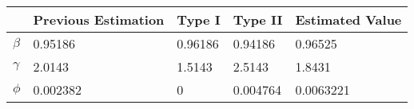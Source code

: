\begin{tabular}{lllll}
& Previous Estimation & Type I & Type II & Estimated Value \\ 
\hline 
$\beta$ & 0.95186 & 0.96186 & 0.94186 & 0.96525 \\ 
$\gamma$ & 2.0143 & 1.5143 & 2.5143 & 1.8431 \\ 
$\phi$ & 0.002382 & 0 & 0.004764 & 0.0063221 \\ 
\hline 
\end{tabular}